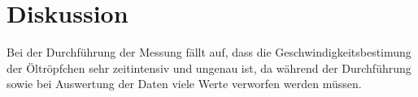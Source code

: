 \section{Diskussion}
\label{sec:Diskussion}


Bei der Durchführung der Messung fällt auf, dass die 
Geschwindigkeitsbestimung der Öltröpfchen sehr zeitintensiv und 
ungenau ist, da während der Durchführung sowie bei Auswertung der Daten viele Werte verworfen werden müssen. \\
